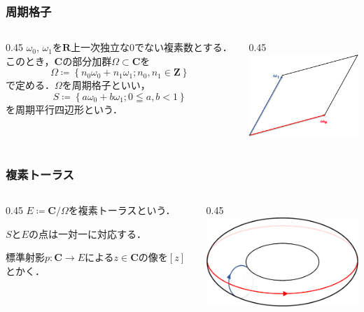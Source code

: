 \documentclass[dvipdfmx,12pt,aspectratio=169]{beamer}%
\newcommand{\zz}{\mathbf{Z}}
\newcommand{\rr}{\mathbf{R}}
\newcommand{\cc}{\mathbf{C}}
\begin{document}
\begin{frame}
    \frametitle{周期格子}
    \begin{columns}
        \begin{column}{0.45\hsize}
            $\omega_0$, $\omega_1$を$\rr$上一次独立な$0$でない複素数とする．
            このとき，$\cc$の部分加群$\Omega\subset\cc$を
            \begin{equation*}
                \Omega\coloneqq\left\{n_0\omega_0+n_1\omega_1;n_0,n_1\in\zz\right\}
            \end{equation*}
            で定める．$\Omega$を周期格子といい，
            \begin{equation*}
                S\coloneqq\left\{a\omega_0+b\omega_1;0\leqq a,b <1\right\}
            \end{equation*}
            を周期平行四辺形という．
        \end{column}
        \begin{column}{0.45\hsize}
            \includegraphics[width=6cm]{fig/lattice.pdf}
            \centering
        \end{column}
    \end{columns}
\end{frame}

\begin{frame}
    \frametitle{複素トーラス}
    \begin{columns}
        \begin{column}{0.45\hsize}
            $E\coloneqq \cc/\Omega$を複素トーラスという．

            $S$と$E$の点は一対一に対応する．

            標準射影$p\colon \cc\to E$による$z\in\cc$の像を$[z]$とかく．
        \end{column}
        \begin{column}{0.45\hsize}
            \includegraphics[width=6cm]{fig/torus.pdf}
            \centering
        \end{column}
    \end{columns}
\end{frame}
\end{document}
